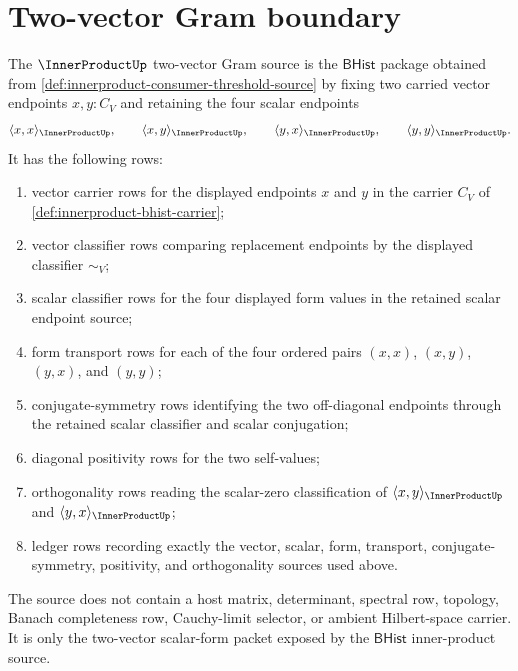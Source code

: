 \section{Two-vector Gram boundary}
\label{sec:innerproduct-two-vector-gram-boundary}

\begin{definition}
\label{def:innerproduct-two-vector-gram-source}
The $\InnerProductUp$ two-vector Gram source is the $\mathsf{BHist}$ package
obtained from \autoref{def:innerproduct-consumer-threshold-source} by fixing
two carried vector endpoints $x,y:C_V$ and retaining the four scalar
endpoints
$$
\langle x,x\rangle_{\InnerProductUp},\qquad
\langle x,y\rangle_{\InnerProductUp},\qquad
\langle y,x\rangle_{\InnerProductUp},\qquad
\langle y,y\rangle_{\InnerProductUp}.
$$
It has the following rows:
\begin{enumerate}
  \item vector carrier rows for the displayed endpoints $x$ and $y$ in the
  carrier $C_V$ of \autoref{def:innerproduct-bhist-carrier};
  \item vector classifier rows comparing replacement endpoints by the
  displayed classifier $\sim_V$;
  \item scalar classifier rows for the four displayed form values in the
  retained scalar endpoint source;
  \item form transport rows for each of the four ordered pairs $(x,x)$,
  $(x,y)$, $(y,x)$, and $(y,y)$;
  \item conjugate-symmetry rows identifying the two off-diagonal endpoints
  through the retained scalar classifier and scalar conjugation;
  \item diagonal positivity rows for the two self-values;
  \item orthogonality rows reading the scalar-zero classification of
  $\langle x,y\rangle_{\InnerProductUp}$ and
  $\langle y,x\rangle_{\InnerProductUp}$;
  \item ledger rows recording exactly the vector, scalar, form, transport,
  conjugate-symmetry, positivity, and orthogonality sources used above.
\end{enumerate}
The source does not contain a host matrix, determinant, spectral row,
topology, Banach completeness row, Cauchy-limit selector, or ambient
Hilbert-space carrier. It is only the two-vector scalar-form packet exposed
by the $\mathsf{BHist}$ inner-product source.
\end{definition}

